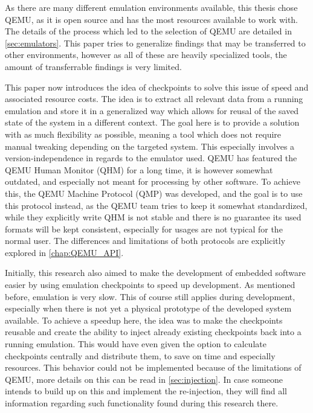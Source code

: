 As there are many different emulation environments available,
this thesis chose QEMU, as it is open source and has the most resources available to work with.
The details of the process which led to the selection of QEMU are detailed in \autoref{sec:emulators}.
This paper tries to generalize findings that may be transferred to other environments,
however as all of these are heavily specialized tools,
the amount of transferrable findings is very limited.

This paper now introduces the idea of checkpoints to solve this issue of speed and associated resource costs.
The idea is to extract all relevant data from a running emulation
and store it in a generalized way which allows for reusal of the saved state of the system in a different context.
The goal here is to provide a solution with as much flexibility as possible,
meaning a tool which does not require manual tweaking depending on the targeted system.
This especially involves a version-independence in regards to the emulator used.
QEMU has featured the QEMU Human Monitor (QHM) for a long time,
it is however somewhat outdated, and especially not meant for processing by other software.
To achieve this, the QEMU Machine Protocol (QMP) was developed, and the goal is to use this protocol instead,
as the QEMU team tries to keep it somewhat standardized,
while they explicitly write QHM is not stable and there is no guarantee its used formats will be kept consistent,
especially for usages are not typical for the normal user.
The differences and limitations of both protocols are explicitly explored in \autoref{chap:QEMU_API}.

Initially, this research also aimed to make the development of embedded software easier by using emulation checkpoints to speed up development.
As mentioned before, emulation is very slow.
This of course still applies during development, especially when there is not yet a physical prototype of the developed system available.
To achieve a speedup here, the idea was to make the checkpoints reusable
and create the ability to inject already existing checkpoints back into a running emulation.
This would have even given the option to calculate checkpoints centrally and distribute them,
to save on time and especially resources.
This behavior could not be implemented because of the  limitations of QEMU,
more details on this can be read in \autoref{sec:injection}.
In case someone intends to build up on this and implement the re-injection,
they will find all information regarding such functionality found during this research there.